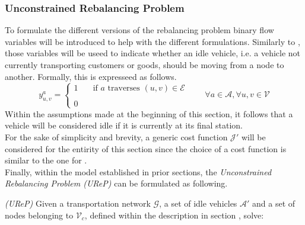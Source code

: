 \subsubsection*{Unconstrained Rebalancing Problem}
To formulate the different versions of the rebalancing problem binary flow variables will be introduced to help with the different formulations. Similarly to , those variables will be useed to indicate whether an idle vehicle, i.e. a vehicle not currently transporting customers or goods, should be moving from a node to another. Formally, this is expresseed as follows. 
\begin{equation*}
	y_{u,v}^a = 
	\begin{cases} 
		1 & \quad \text{if $a$ traverses } (u,v) \in \mathcal{E}\\
		\\
		0
	\end{cases}
	\quad\quad \forall a \in \mathcal{A}, \forall u,v \in \mathcal{V}
	\label{eq:binary_edges_reb}
\end{equation*}
Within the assumptions made at the beginning of this section, it follows that a vehicle will be considered idle if it is currently at its final station. \\
For the sake of simplicity and brevity, a generic cost function $\mathcal{J'}$ will be considered for the entirity of this section since the choice of a cost function is similar to the one for . \\
Finally, within the model established in prior sections, the \textit{Unconstrained Rebalancing Problem (UReP)} can be formulated as following. \\
\begin{algori}{\textit{(UReP)}}
	Given a transportation network $\mathcal{G}$, a set of idle vehicles $\mathcal{A'}$ and a set of nodes belonging to $ \mathcal{V}_c$, defined within the description in section , solve:
\end{algori}





